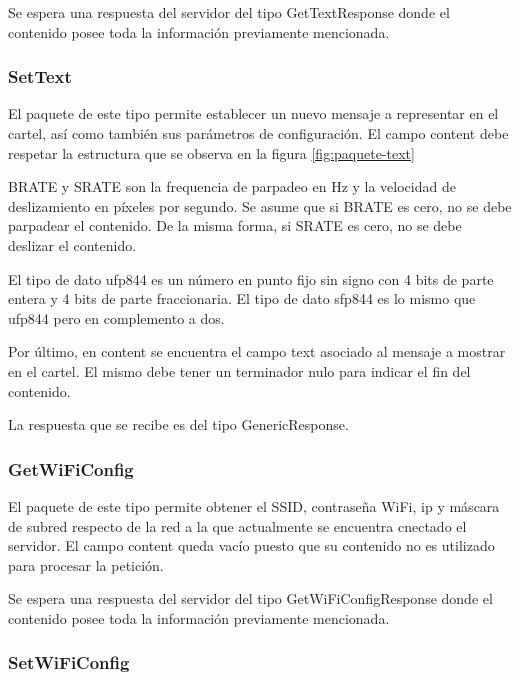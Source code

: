 Se espera una respuesta del servidor del tipo GetTextResponse donde el contenido posee toda la información previamente mencionada.



\subsubsection{SetText}

El paquete de este tipo permite establecer un nuevo mensaje a representar en el cartel, así como también sus parámetros de configuración.
El campo content debe respetar la estructura que se observa en la figura \ref{fig:paquete-text}


BRATE y SRATE son la frequencia de parpadeo en Hz y la velocidad de deslizamiento en píxeles por segundo.
Se asume que si BRATE es cero, no se debe parpadear el contenido.
De la misma forma, si SRATE es cero, no se debe deslizar el contenido.

El tipo de dato ufp844 es un número en punto fijo sin signo con 4 bits de parte entera y 4 bits de parte fraccionaria.
El tipo de dato sfp844 es lo mismo que ufp844 pero en complemento a dos.

Por último, en content se encuentra el campo text asociado al mensaje a mostrar en el cartel.
El mismo debe tener un terminador nulo para indicar el fin del contenido.

La respuesta que se recibe es del tipo GenericResponse.



\subsubsection{GetWiFiConfig}

El paquete de este tipo permite obtener el SSID, contraseña WiFi, ip y máscara de subred respecto de la red a la que actualmente se encuentra cnectado el servidor.
El campo content queda vacío puesto que su contenido no es utilizado para procesar la petición.

Se espera una respuesta del servidor del tipo GetWiFiConfigResponse donde el contenido posee toda la información previamente mencionada.



\subsubsection{SetWiFiConfig}

